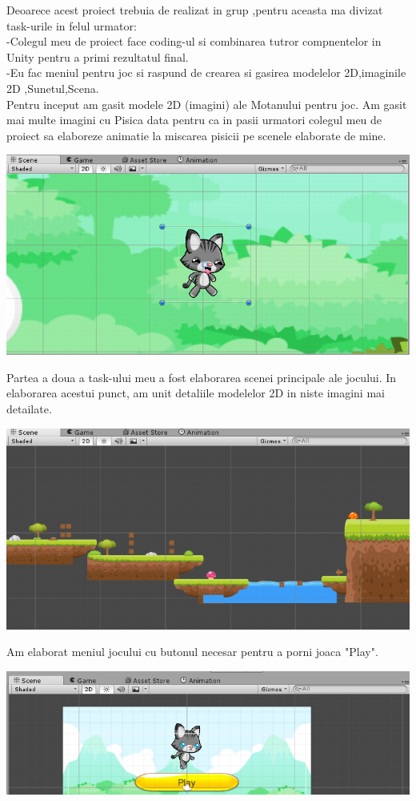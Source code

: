 Deoarece acest proiect trebuia de realizat in grup ,pentru aceasta ma divizat task-urile in felul urmator:\\
-Colegul meu de proiect face coding-ul si combinarea tutror compnentelor in Unity pentru a primi rezultatul final.\\
-Eu fac meniul pentru joc si raspund de crearea si gasirea modelelor 2D,imaginile 2D ,Sunetul,Scena.\\

Pentru inceput am gasit modele 2D (imagini) ale Motanului pentru joc. Am gasit mai multe imagini cu Pisica data pentru ca in pasii urmatori colegul meu de proiect sa elaboreze animatie la miscarea pisicii pe scenele elaborate de mine.
\begin{center}
\includegraphics[scale=1]{images/cat}
\end{center}

Partea a doua a task-ului meu a fost elaborarea scenei principale ale jocului. In elaborarea acestui punct, am unit detaliile modelelor 2D in niste imagini mai detailate.
\begin{center}
\includegraphics[scale=1]{images/ground}
\end{center}

Am elaborat meniul jocului cu butonul necesar pentru a porni joaca "Play".
\begin{center}
\includegraphics[scale=1]{images/menu}\\
\end{center}

